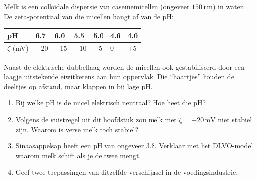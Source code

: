 \begin{oefening}
Melk is een colloïdale dispersie van caseïnemicellen (ongeveer \(150\,\mathrm{nm}\)) in water. De zeta-potentiaal van die micellen hangt af van de pH:

\begin{center}
\begin{tabular}{lllllll}
\toprule
pH & 6.7 & 6.0 & 5.5 & 5.0 & 4.6 & 4.0 \\
\midrule
\(\zeta\) (mV) & \ensuremath{-}20 & \ensuremath{-}15 & \ensuremath{-}10 & \ensuremath{-}5 & 0 & +5 \\
\bottomrule
\end{tabular}
\end{center}

Naast de elektrische dubbellaag worden de micellen ook gestabiliseerd door een laagje uitstekende eiwitketens aan hun oppervlak. Die ``haartjes'' houden de deeltjes op afstand, maar klappen in bij lage pH.

\begin{enumerate}
\item[(a)]
  Bij welke pH is de micel elektrisch neutraal? Hoe heet die pH?
\item[(b)]
  Volgens de vuistregel uit dit hoofdstuk zou melk met \(\zeta = -20\,\mathrm{mV}\) niet stabiel zijn. Waarom is verse melk toch stabiel?
\item[(c)]
  Sinaasappelsap heeft een pH van ongeveer 3.8. Verklaar met het DLVO-model waarom melk schift als je de twee mengt.
\item[(d)]
  Geef twee toepassingen van ditzelfde verschijnsel in de voedingsindustrie.
\end{enumerate}
\end{oefening}
